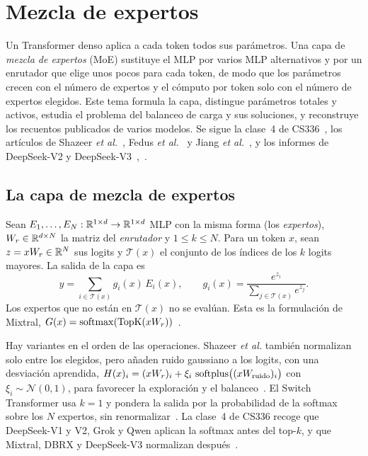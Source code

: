 \chapter{Mezcla de expertos}
\label{tema:4}

Un Transformer denso aplica a cada token todos sus parámetros. Una capa de \emph{mezcla de expertos} (MoE) sustituye el MLP por varios MLP alternativos y por un enrutador que elige unos pocos para cada token, de modo que los parámetros crecen con el número de expertos y el cómputo por token solo con el número de expertos elegidos. Este tema formula la capa, distingue parámetros totales y activos, estudia el problema del balanceo de carga y sus soluciones, y reconstruye los recuentos publicados de varios modelos. Se sigue la clase~4 de CS336~\cite{cs336}, los artículos de Shazeer \emph{et al.}~\cite[§2 y §4]{shazeer2017}, Fedus \emph{et al.}~\cite[§2]{switch} y Jiang \emph{et al.}~\cite[§2]{mixtral}, y los informes de DeepSeek-V2 y DeepSeek-V3~\cite[§2.2]{deepseekv2},~\cite[§2.1.2]{deepseekv3}.

\section{La capa de mezcla de expertos}

\begin{definicion}\label{def:moe}
Sean $E_1,\dots,E_N:\mathbb{R}^{1\times d}\to\mathbb{R}^{1\times d}$ MLP con la misma forma (los \emph{expertos}), $W_r\in\mathbb{R}^{d\times N}$ la matriz del \emph{enrutador} y $1\le k\le N$. Para un token $x$, sean $z=xW_r\in\mathbb{R}^{N}$ sus logits y $\mathcal T(x)$ el conjunto de los índices de los $k$ logits mayores. La salida de la capa es
\[
y=\sum_{i\in\mathcal T(x)}g_i(x)\,E_i(x),\qquad g_i(x)=\frac{e^{z_i}}{\sum_{j\in\mathcal T(x)}e^{z_j}} .
\]
Los expertos que no están en $\mathcal T(x)$ no se evalúan. Esta es la formulación de Mixtral, $G(x)=\operatorname{softmax}(\operatorname{TopK}(xW_r))$~\cite[§2.1]{mixtral}.
\end{definicion}

\addtocounter{figure}{1}%

Hay variantes en el orden de las operaciones. Shazeer \emph{et al.} también normalizan solo entre los elegidos, pero añaden ruido gaussiano a los logits, con una desviación aprendida, $H(x)_i=(xW_r)_i+\xi_i\,\operatorname{softplus}\bigl((xW_{\mathrm{ruido}})_i\bigr)$ con $\xi_i\sim\mathcal N(0,1)$, para favorecer la exploración y el balanceo~\cite[§2.1]{shazeer2017}. El Switch Transformer usa $k=1$ y pondera la salida por la probabilidad de la softmax sobre los $N$ expertos, sin renormalizar~\cite[§2.1]{switch}. La clase~4 de CS336 recoge que DeepSeek-V1 y V2, Grok y Qwen aplican la softmax antes del top-$k$, y que Mixtral, DBRX y DeepSeek-V3 normalizan después~\cite{cs336}.

